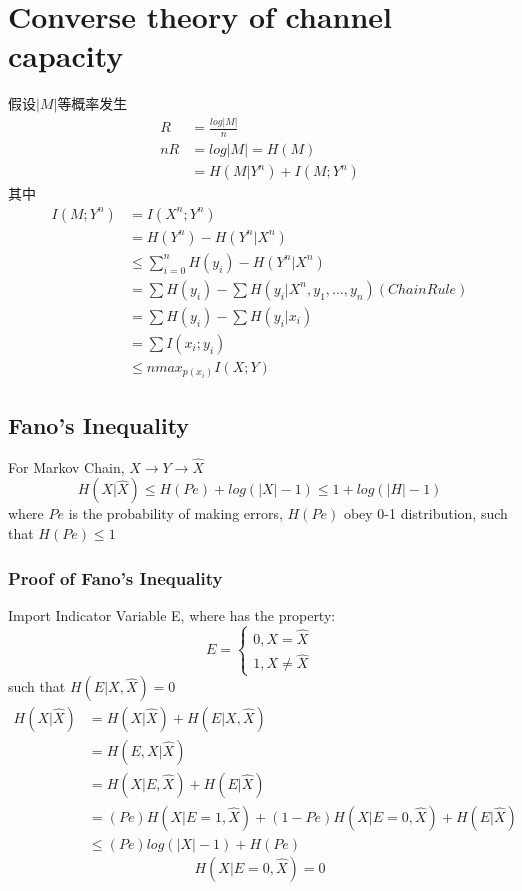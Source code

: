 \documentclass[a4paper, 12pt]{article}
\begin{document}
    \section{Converse theory of channel capacity}
    假设$|M|$等概率发生
    \begin{equation}
        \begin{aligned}
            R&=\frac{log|M|}{n}\\
            nR&=log|M|=H(M)\\
            &=H(M|Y^n)+I(M;Y^n)
        \end{aligned}
    \end{equation}
    其中
    \begin{equation}
        \begin{aligned}
            I(M;Y^n)&=I(X^n;Y^n)\\
            &=H(Y^n)-H(Y^n|X^n)\\
            &\le \sum_{i=0}^{n}H(y_i)-H(Y^n|X^n)\\
            &=\sum H(y_i) - \sum H(y_i|X^n, y_1,...,y_n)(Chain Rule)\\
            &=\sum H(y_i)- \sum H(y_i|x_i)\\
            &=\sum I(x_i;y_i)\\
            &\le nmax_{p(x_i)}I(X;Y)
        \end{aligned}
    \end{equation}
    \subsection{Fano's Inequality}
    For Markov Chain, $X\rightarrow Y \rightarrow \hat{X}$
    \[
        H(X|\hat{X})\le H(Pe) + log(|X|-1) \le 1 + log(|H|-1)    
    \]
    where $Pe$ is the probability of making errors, $H(Pe)$ obey 0-1 distribution, 
    such that $H(Pe) \le 1$
    \subsubsection{Proof of Fano's Inequality}
    Import Indicator Variable E, where has the property:
    \[
        E=\left\{
            \begin{array}{rcl}
                0,X=\hat{X}\\
                1,X\neq\hat{X}
            \end{array}
            \right.
    \]
    such that $H(E|X,\hat{X}) = 0$
    \begin{equation}
        \begin{aligned}
            H(X|\hat{X})&=H(X|\hat{X}) + H(E|X,\hat{X})\\
            &=H(E,X|\hat{X})\\
            &=H(X|E, \hat{X})+H(E|\hat{X})\\
            &=(Pe)H(X|E=1,\hat{X}) + (1-Pe)H(X|E=0,\hat{X}) + H(E|\hat{X})\\
            &\le (Pe)log(|X|-1) + H(Pe)
        \end{aligned}
    \end{equation}
    \[
        H(X|E=0,\hat{X}) = 0    
    \]
\end{document}
